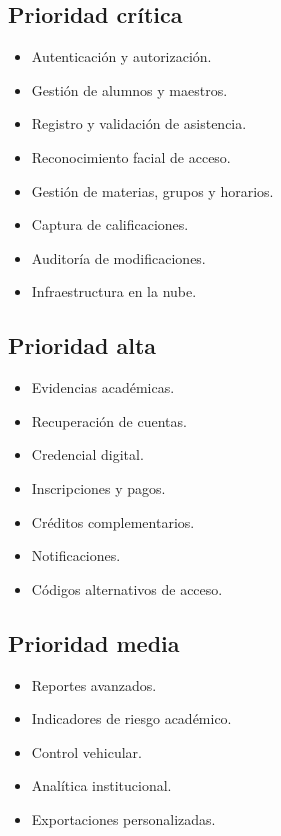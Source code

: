 \documentclass[12pt,a4paper]{article}
\begin{document}
\subsection{Prioridad crítica}

\begin{itemize}[leftmargin=*]
\item Autenticación y autorización.
\item Gestión de alumnos y maestros.
\item Registro y validación de asistencia.
\item Reconocimiento facial de acceso.
\item Gestión de materias, grupos y horarios.
\item Captura de calificaciones.
\item Auditoría de modificaciones.
\item Infraestructura en la nube.
\end{itemize}

\subsection{Prioridad alta}

\begin{itemize}[leftmargin=*]
\item Evidencias académicas.
\item Recuperación de cuentas.
\item Credencial digital.
\item Inscripciones y pagos.
\item Créditos complementarios.
\item Notificaciones.
\item Códigos alternativos de acceso.
\end{itemize}

\subsection{Prioridad media}

\begin{itemize}[leftmargin=*]
\item Reportes avanzados.
\item Indicadores de riesgo académico.
\item Control vehicular.
\item Analítica institucional.
\item Exportaciones personalizadas.
\end{itemize}
\end{document}
